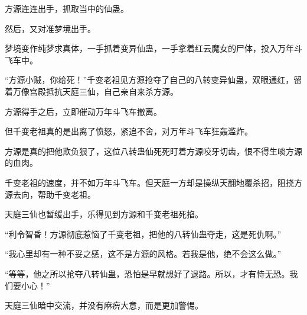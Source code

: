 \begin{this_body}
方源连连出手，抓取当中的仙蛊。

然后，又对准梦境出手。

梦境变作纯梦求真体，一手抓着变异仙蛊，一手拿着红云魔女的尸体，投入万年斗飞车中。

“方源小贼，你给死！”千变老祖见方源抢夺了自己的八转变异仙蛊，双眼通红，留着万像宫殿抵抗天庭三仙，自己亲自来杀方源。

方源得手之后，立即催动万年斗飞车撤离。

但千变老祖真的是出离了愤怒，紧追不舍，对万年斗飞车狂轰滥炸。

方源是真的把他欺负狠了，这位八转蛊仙死死盯着方源咬牙切齿，恨不得生啖方源的血肉。

千变老祖的速度，并不如万年斗飞车。但天庭一方却是操纵天翻地覆杀招，阻挠方源去向，帮助千变老祖。

天庭三仙也暂缓出手，乐得见到方源和千变老祖死掐。

“利令智昏！方源彻底惹恼了千变老祖，把他的八转仙蛊夺走，这是死仇啊。”

“我心里却有一种不妥之感，这不是方源的风格。若我是他，绝不会这么做。”

“等等，他之所以抢夺八转仙蛊，恐怕是早就想好了退路。所以，才有恃无恐。我们要小心！”

天庭三仙暗中交流，并没有麻痹大意，而是更加警惕。

\end{this_body}

